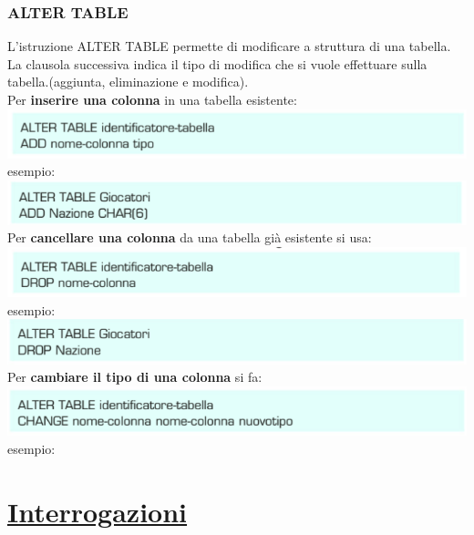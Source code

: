 \documentclass{article}
\begin{document}
    \subsubsection{ALTER TABLE}
    L'istruzione ALTER TABLE permette di modificare a struttura di una tabella. La clausola successiva indica il tipo di modifica che si vuole effettuare sulla tabella.(aggiunta, eliminazione e modifica).\\
    Per \textbf{inserire una colonna} in una tabella esistente:\\
    \includegraphics[scale=1.2]{at.PNG}\\
    \footnotesize{esempio:}\\
    \includegraphics[scale=1.2]{esat.PNG}  \\
    Per \textbf{cancellare una colonna} da una tabella già esistente si usa:\\
    \includegraphics[scale=1.2]{atc.PNG}\\
    \footnotesize{esempio:}\\
    \includegraphics[scale=1.2]{esn.PNG}\\
    Per \textbf{cambiare il tipo di una colonna} si fa:\\
    \includegraphics[scale=1.2]{modid.PNG}\\
    \footnotesize{esempio:}
    
    
    
    
    
\newpage
\section{\underline{Interrogazioni}}
\end{document}
